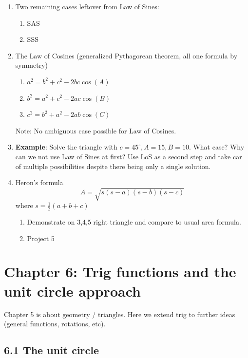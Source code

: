 \documentclass{article}
\begin{document}
\begin{enumerate}

\item Two remaining cases leftover from Law of Sines:
\begin{enumerate}
\item SAS
\item SSS
\end{enumerate}

\item The Law of Cosines (generalized Pythagorean theorem, all one formula by symmetry)
\begin{enumerate}
\item $a^2 = b^2+c^2-2bc\cos(A)$
\item $b^2 = a^2+c^2-2ac\cos(B)$
\item $c^2 = b^2+a^2-2ab\cos(C)$
\end{enumerate}
Note: No ambiguous case possible for Law of Cosines.

\item {\bf Example}: Solve the triangle with $c=45^{\circ}, A=15, B=10$. What case? Why can we not use Law of Sines at first? Use LoS as a second step and take car of multiple possibilities despite there being only a single solution.

\item Heron's formula
$$
A = \sqrt{s(s-a)(s-b)(s-c)}
$$
where $s = \frac{1}{2}(a+b+c)$
\begin{enumerate}
\item Demonstrate on 3,4,5 right triangle and compare to usual area formula.
\item Project 5
\end{enumerate}
\end{enumerate}


\section{Chapter 6: Trig functions and the unit circle approach}

Chapter 5 is about geometry / triangles. Here we extend trig to further ideas (general functions, rotations, etc).

\subsection{6.1 The unit circle}
\end{document}
